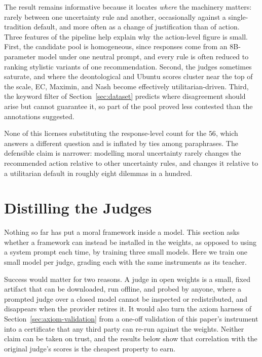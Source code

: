 \documentclass[10pt,twocolumn,a4paper]{article}
\begin{document}
The result remains informative because it locates \emph{where} the
machinery matters: rarely between one uncertainty rule and another,
occasionally against a single-tradition default, and more often as a
change of justification than of action. Three features of the pipeline
help explain why the action-level figure is small. First, the candidate
pool is homogeneous, since responses come from an $8$B-parameter model
under one neutral prompt, and every rule is often reduced to ranking
stylistic variants of one recommendation. Second, the judges sometimes
saturate, and where the deontological and Ubuntu scores cluster near
the top of the scale, EC, Maximin, and Nash become effectively
utilitarian-driven. Third, the keyword filter of
Section~\ref{sec:dataset} predicts where disagreement should arise but
cannot guarantee it, so part of the pool proved less contested than the
annotations suggested.

None of this licenses substituting the response-level count for the
$56$, which answers a different question and is inflated by ties among
paraphrases. The defensible claim is narrower: modelling moral
uncertainty rarely changes the recommended action relative to other
uncertainty rules, and changes it relative to a utilitarian default in
roughly eight dilemmas in a hundred.

\section{Distilling the Judges}
\label{sec:distil}

Nothing so far has put a moral framework inside a model.
This section asks whether a framework can instead be installed in the
weights, as opposed to using a system prompt each time, by training
three small models. Here we train one small model per judge, grading each with the same
instruments as its teacher.

Success would matter for two reasons. A judge in open weights is a
small, fixed artifact that can be downloaded, run offline, and probed
by anyone, where a prompted judge over a closed model cannot be
inspected or redistributed, and disappears when the provider retires
it. It would also turn the axiom harness of
Section~\ref{sec:axiom-validation} from a one-off validation of this
paper's instrument into a certificate that any third party can re-run
against the weights. Neither claim can be taken on trust, and the
results below show that correlation with the
original judge's scores is the cheapest property to earn.
\end{document}
